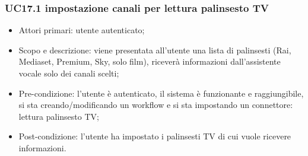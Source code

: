 \subsubsection{UC17.1 impostazione canali per lettura palinsesto TV}
\begin{itemize}
	\item  Attori primari: utente autenticato;
	\item  Scopo e descrizione: viene presentata all'utente una lista di palinsesti (Rai, Mediaset, Premium, Sky, solo film), riceverà informazioni dall'assistente vocale solo dei canali scelti;
	\item  Pre-condizione: l'utente è autenticato, il sistema è funzionante e raggiungibile, si sta creando/modificando un workflow e si sta impostando un connettore: lettura palinsesto TV;
	\item  Post-condizione: l'utente ha impostato i palinsesti TV di cui vuole ricevere informazioni.
\end{itemize}
